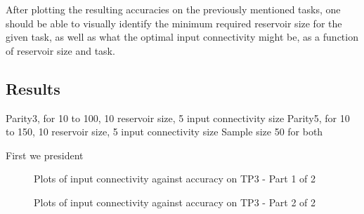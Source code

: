 After plotting the resulting accuracies on the previously mentioned tasks,
one should be able to visually identify the minimum required reservoir size for the given task,
as well as what the optimal input connectivity might be, as a function of reservoir size and task.

\label{experiments:1:results}
\subsection{Results}

Parity3, for 10 to 100, 10 reservoir size, 5 input connectivity size
Parity5, for 10 to 150, 10 reservoir size, 5 input connectivity size
Sample size 50 for both

First we president 

\begin{figure*}[ht]
    \centering
    \resizebox{\textwidth}{!}{
        \subfloat[N=10]{
            
        }
        \subfloat[N=20]{
            
        }
    }
    \resizebox{\textwidth}{!}{
        \subfloat[N=30]{
            
        }
        \subfloat[N=40]{
            
        }
    }
    \resizebox{\textwidth}{!}{
        \subfloat[N=50]{
            
        }
        \subfloat[N=60]{
            
        }
    }
    \label{fig:results:tp3-1}
    \caption{Plots of input connectivity against accuracy on TP3 - Part 1 of 2}
\end{figure*}

\begin{figure*}[ht]
    \centering
    \resizebox{\textwidth}{!}{
        \subfloat[N=70]{
            
        }
        \subfloat[N=80]{
            
        }
    }
    \resizebox{\textwidth}{!}{
        \subfloat[N=90]{
            
        }
        \subfloat[N=100]{
            
        }
    }
    \label{fig:results:tp3-2}
    \caption{Plots of input connectivity against accuracy on TP3 - Part 2 of 2}
\end{figure*}

